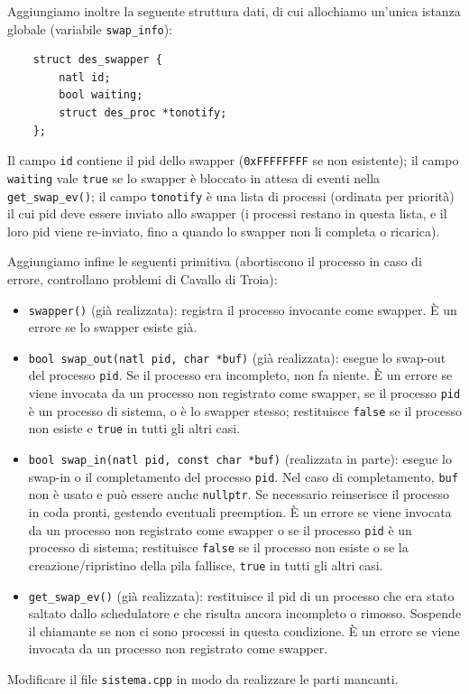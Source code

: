 Aggiungiamo inoltre la seguente struttura dati, di cui allochiamo
un'unica istanza globale (variabile \verb|swap_info|):
\begin{verbatim}
    struct des_swapper {
    	natl id;
    	bool waiting;
    	struct des_proc *tonotify;
    };
\end{verbatim}
Il campo \verb|id| contiene il pid dello swapper (\verb|0xFFFFFFFF|
se non esistente); il campo \verb|waiting| vale \verb|true| se lo
swapper \`e bloccato in attesa di eventi nella \verb|get_swap_ev()|;
il campo \verb|tonotify| \`e una lista di processi (ordinata per
priorit\`a) il cui pid deve essere inviato allo swapper (i processi
restano in questa lista, e il loro pid viene re-inviato, fino a
quando lo swapper non li completa o ricarica).

Aggiungiamo infine le seguenti primitiva (abortiscono il processo
in caso di errore, controllano problemi di Cavallo di Troia):
\begin{itemize}
 \item \verb|swapper()| (gi\`a realizzata): registra il processo invocante come
  swapper. \`E un errore se lo swapper esiste gi\`a.
 \item \verb|bool swap_out(natl pid, char *buf)| (gi\`a realizzata):
  esegue lo swap-out del processo \verb|pid|.  Se il processo era
  incompleto, non fa niente. \`E un errore se viene invocata da un
  processo non registrato come swapper, se il processo \verb|pid| \`e un
  processo di sistema, o \`e lo swapper stesso; restituisce \verb|false|
  se il processo non esiste e \verb|true| in tutti gli altri casi.
 \item \verb|bool swap_in(natl pid, const char *buf)| (realizzata in parte):
 esegue lo swap-in o il completamento del processo \verb|pid|.  Nel
 caso di completamento, \verb|buf| non \`e usato e pu\`o essere
 anche \verb|nullptr|. Se necessario reinserisce il processo in
 coda pronti, gestendo eventuali preemption.  \`E un errore se viene
 invocata da un processo non registrato come swapper o se il processo
 \verb|pid| \`e un processo di sistema; restituisce \verb|false|
 se il processo non esiste o se la creazione/ripristino della pila
 fallisce, \verb|true| in tutti gli altri casi.
 \item \verb|get_swap_ev()| (gi\`a realizzata):
 restituisce il pid di un processo che era stato saltato dallo
 schedulatore e che risulta ancora incompleto o rimosso. Sospende
 il chiamante se non ci sono processi in questa condizione. \`E un
 errore se viene invocata da un processo non registrato come swapper.
\end{itemize}
Modificare il file \verb|sistema.cpp| in modo da realizzare le parti mancanti.

